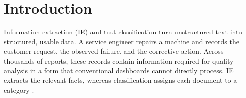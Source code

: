 \section{Introduction}
\label{sec:introduction}

Information extraction (IE) and text classification turn unstructured text
into structured, usable data. A service engineer repairs a machine and records
the customer request, the observed failure, and the corrective action. Across
thousands of reports, these records contain information required for quality
analysis in a form that conventional dashboards cannot directly process. IE
extracts the relevant facts, whereas classification assigns each document to a
category \citep{xu2024generative}.


